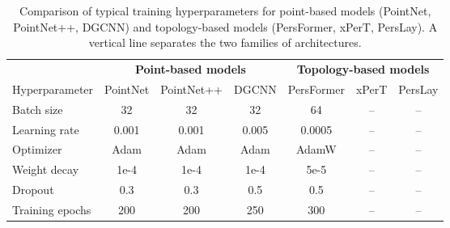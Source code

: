 \begin{table}[h!]
  \centering
  \begin{tabular}{l|ccc|ccc}
  \toprule
    & \multicolumn{3}{c|}{\textbf{Point-based models}} & \multicolumn{3}{c}{\textbf{Topology-based models}} \\
    Hyperparameter  & PointNet & PointNet++ & DGCNN & PersFormer & xPerT & PersLay \\
  \midrule
  Batch size              & 32    & 32    & 32    & 64    & --    & -- \\
  Learning rate           & 0.001 & 0.001 & 0.005 & 0.0005 & -- & -- \\
  Optimizer               & Adam  & Adam  & Adam  & AdamW  & --  & -- \\
  Weight decay            & 1e-4  & 1e-4  & 1e-4  & 5e-5  & --  & -- \\
  Dropout                 & 0.3   & 0.3   & 0.5   & 0.5   & --   & -- \\
  Training epochs         & 200   & 200   & 250   & 300   & --   & -- \\
  \bottomrule
  \end{tabular}
  \caption{Comparison of typical training hyperparameters for point-based models (PointNet, PointNet++, DGCNN) and topology-based models (PersFormer, xPerT, PersLay). A vertical line separates the two families of architectures.}
  \label{suppl:topogen-baseline-training}
\end{table}
